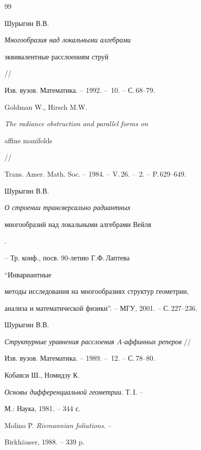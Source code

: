 \begin{thebibliography}{99}


Шурыгин В.В.


{\it Многообразия над локальными алгебрами


эквивалентные расслоениям струй} //


Изв. вузов. Математика. -- 1992. -- \No\,10. -- С.\,68--79.







Goldman W., Hirsch M.W.


{\it The radiance obstruction and parallel forms on


affine manifolds} //


Trans. Amer. Math. Soc. -- 1984. -- V.\,26. -- \No\,2. -- P.\,629--649.







Шурыгин В.В.


{\it О строении трансверсально радиантных


многообразий над локальными алгебрами Вейля}.


-- Тр. конф., посв. 90-летию Г.Ф.\,Лаптева 


``Инвариантные


методы исследования на многообразиях структур геометрии,


анализа и математической физики''. -- МГУ, 2001. -- С.\,227--236.







Шурыгин В.В.


{\it Структурные уравнения расслоения $A$-аффинных реперов} //


Изв. вузов. Математика. -- 1989. -- \No\,12. -- С.\,78--80.







Кобаяси Ш., Номидзу К.


{\it Основы дифференциальной геометрии}. Т.\,I. --


М.: Наука, 1981. -- 344 с.








\end{thebibliography}





\vskip 2cm












\label{end}













Molino P. {\it Riemannian foliations}. --


Birkh\"auser, 1988. -- 339 p.



